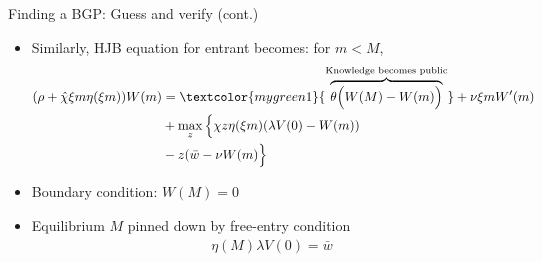\documentclass[english,usenames,dvipsnames]{beamer}
\begin{document}
\begin{frame}{Finding a BGP: Guess and verify (cont.)}
\begin{itemize}
	\small
	\item Similarly, HJB equation for entrant becomes: for $m < M$, 
	\small
	\begin{align*}
	(\rho + \hat{\chi}\xi m \eta(\xi m) ) W(m) &= \textcolor{mygreen1}{\overbrace{\theta \Big(W(M) - W(m)\Big)}^{\text{Knowledge becomes public}}} + \nu \xi m W'(m) \\
	&+ \max_{z} \Big\{ \chi z \eta(\xi m) (\lambda V(0) - W(m))   \\
	&- z (\bar{w} - \nu W(m) \Big\}
	\end{align*}
	\item Boundary condition: $W(M) = 0$ 
	\item Equilibrium $M$ pinned down by free-entry condition
	\begin{align*}
	\eta(M) \lambda V(0) = \bar{w}
	\end{align*}
\end{itemize}
\end{frame}
\end{document}
